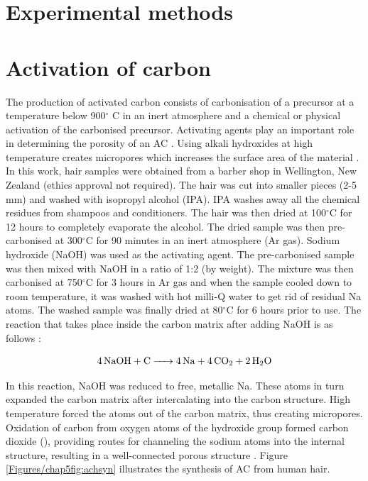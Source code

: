 \section{Experimental methods}
\section*{Activation of carbon}
The production of activated carbon consists of carbonisation of a precursor at a temperature below 900$^{\circ}$ C in an inert atmosphere and a chemical or physical activation of the carbonised precursor. Activating agents play an important role in determining the porosity of an AC \cite{arenas_effect_2004}. Using alkali hydroxides at high temperature creates micropores which increases the surface area of the material \cite{dong_commercial_2019, liu_hair-based_2017}. In this work, hair samples were obtained from a barber shop in Wellington, New Zealand (ethics approval not required). The hair was cut into smaller pieces (2-5 mm) and washed with isopropyl alcohol (IPA). IPA washes away all the chemical residues from shampoos and conditioners. The hair was then dried at 100$^{\circ}$C for 12 hours to completely evaporate the alcohol. The dried sample was then pre-carbonised at 300$^{\circ}$C for 90 minutes in an inert atmosphere (Ar gas). Sodium hydroxide (NaOH) was used as the activating agent. The pre-carbonised sample was then mixed with NaOH in a ratio of 1:2 (by weight). The mixture was then carbonised at 750$^{\circ}$C for 3 hours in Ar gas and when the sample cooled down to room temperature, it was washed with hot milli-Q water to get rid of residual Na atoms. The washed sample was finally dried at 80$^{\circ}$C for 6 hours prior to use. The reaction that takes place inside the carbon matrix after adding NaOH is as follows \cite{satish_macroporous_2015}:

\begin{equation}
    \ce{4NaOH + C -> 4Na + 4CO2 + 2H2O} 
\end{equation}

In this reaction, NaOH was reduced to free, metallic Na. These atoms in turn expanded the carbon matrix after intercalating into the carbon structure. High temperature forced the  atoms out of the carbon matrix, thus creating micropores. Oxidation of carbon from oxygen atoms of the hydroxide group formed carbon dioxide (), providing routes for channeling the sodium atoms into the internal structure, resulting in a well-connected porous structure \cite{satish_macroporous_2015}. Figure \ref{Figures/chap5fig:achsyn} illustrates the synthesis of AC from human hair. 

